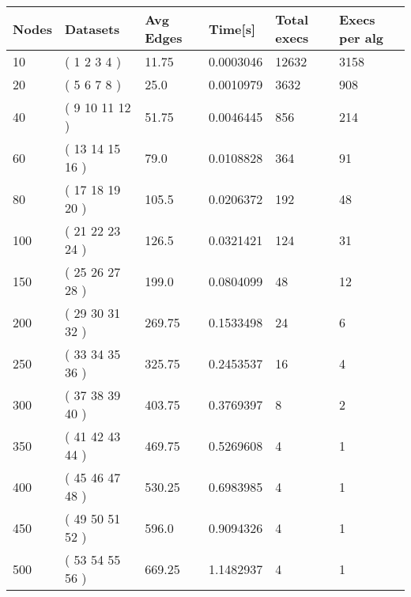 \begin{longtable}[c]{llllll}
  \textbf{Nodes} & \textbf{Datasets} & \textbf{Avg Edges} & \textbf{Time{[}s{]}} & \textbf{Total execs} & \textbf{Execs per alg} \\
  \endhead
  10 & ( 1 2 3 4 ) & 11.75 & 0.0003046 & 12632 & 3158 \\
  20 & ( 5 6 7 8 ) & 25.0 & 0.0010979 & 3632 & 908 \\
  40 & ( 9 10 11 12 ) & 51.75 & 0.0046445 & 856 & 214 \\
  60 & ( 13 14 15 16 ) & 79.0 & 0.0108828 & 364 & 91 \\
  80 & ( 17 18 19 20 ) & 105.5 & 0.0206372 & 192 & 48 \\
  100 & ( 21 22 23 24 ) & 126.5 & 0.0321421 & 124 & 31 \\
  150 & ( 25 26 27 28 ) & 199.0 & 0.0804099 & 48 & 12 \\
  200 & ( 29 30 31 32 ) & 269.75 & 0.1533498 & 24 & 6 \\
  250 & ( 33 34 35 36 ) & 325.75 & 0.2453537 & 16 & 4 \\
  300 & ( 37 38 39 40 ) & 403.75 & 0.3769397 & 8 & 2 \\
  350 & ( 41 42 43 44 ) & 469.75 & 0.5269608 & 4 & 1 \\
  400 & ( 45 46 47 48 ) & 530.25 & 0.6983985 & 4 & 1 \\
  450 & ( 49 50 51 52 ) & 596.0 & 0.9094326 & 4 & 1 \\
  500 & ( 53 54 55 56 ) & 669.25 & 1.1482937 & 4 & 1
  \label{tab:table-kargerstein-results}\\
  \end{longtable}
